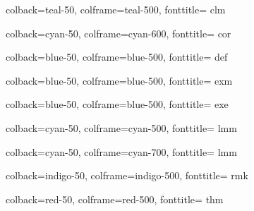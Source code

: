 
{
    colback=teal-50,
    colframe=teal-500,
    fonttitle=\bfseries
}{clm}

{
    colback=cyan-50,
    colframe=cyan-600,
    fonttitle=\bfseries
}{cor}

{
    colback=blue-50,
    colframe=blue-500,
    fonttitle=\bfseries
}{def}

{
    colback=blue-50,
    colframe=blue-500,
    fonttitle=\bfseries
}{exm}

{
    colback=blue-50,
    colframe=blue-500,
    fonttitle=\bfseries
}{exe}

{
    colback=cyan-50,
    colframe=cyan-500,
    fonttitle=\bfseries
}{lmm}

{
    colback=cyan-50,
    colframe=cyan-700,
    fonttitle=\bfseries
}{lmm}

{
    colback=indigo-50,
    colframe=indigo-500,
    fonttitle=\bfseries
}{rmk}

{
    colback=red-50,
    colframe=red-500,
    fonttitle=\bfseries
}{thm}
